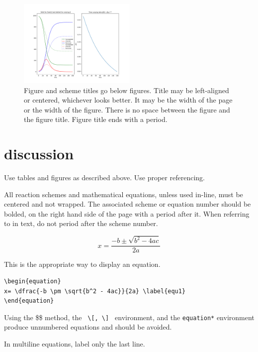 \documentclass[10pt]{article}
\begin{document}
\begin{figure}[ht!]
\centering
\includegraphics[width=0.5\textwidth]{sir_with_varing_beta.pdf}
\caption{Figure and scheme titles go below figures. Title may be left-aligned or centered, whichever looks better. It may be the width of the page or the width of the figure. There is no space between the figure and the figure title. Figure title ends with a period.}\label{sample image}
\end{figure}

\section*{discussion}
Use tables and figures as described above. Use proper referencing.\cite{web}

All reaction schemes and mathematical equations, unless used in-line, must be centered and not wrapped. The associated scheme or equation number should be bolded, on the right hand side of the page with a period after it. When referring to  in text, do not period after the scheme number.

\begin{equation}
x= \dfrac{-b \pm \sqrt{b^2 - 4ac}}{2a} \label{equ1}
\end{equation}

This is the appropriate way to display an equation.

\begin{verbatim}
\begin{equation} 
x= \dfrac{-b \pm \sqrt{b^2 - 4ac}}{2a} \label{equ1}
\end{equation}
\end{verbatim}

 Using the \$\$ method, the \verb+ \[, \] + environment, and the \verb+equation*+ environment produce unnumbered equations and should be avoided. 

In multiline equations, label only the last line.
\end{document}
